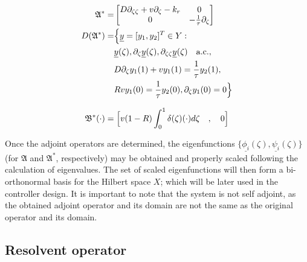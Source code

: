\begin{equation} \label{eq:2_adjoint_A}
    \begin{aligned}
        {\mathfrak{A}}^{*} =&
        \begin{bmatrix}
            D \partial_{\zeta \zeta} + v \partial_\zeta - k_r & 0\\
            0 & -\frac{1}{\tau} \partial_\zeta
        \end{bmatrix}\\
        D(\mathfrak{A}^*) =& \Bigl\{ \underline{y} = [y_1, y_2]^T \in Y:\\
        &\underline{y}(\zeta), \partial_\zeta \underline{y}(\zeta), \partial_{\zeta \zeta} \underline{y}(\zeta) \quad \mathrm{a.c.},\\
        &D \partial_\zeta y_1(1) + v y_1(1) = \frac{1}{\tau} y_2(1), \\
        &R v y_1(0) = \frac{1}{\tau} y_2(0), 
        \partial_\zeta y_1(0) = 0 \Bigr\}
    \end{aligned}
\end{equation}

\begin{equation} \label{eq:2_adjoint_B}
    \mathfrak{B}^* (\cdot) = \Bigl[ v(1-R) \int_0^1 \delta(\zeta) (\cdot) d\zeta \quad , \quad 0 \Bigr]
\end{equation}

Once the adjoint operators are determined, the eigenfunctions $\{ \underline{\phi_i}(\zeta), \underline{\psi_i}(\zeta) \}$ (for $\mathfrak{A}$ and $\mathfrak{A}^*$, respectively) may be obtained and properly scaled following the calculation of eigenvalues. The set of scaled eigenfunctions will then form a bi-orthonormal basis for the Hilbert space $X$; which will be later used in the controller design. It is important to note that the system is not self adjoint, as the obtained adjoint operator and its domain are not the same as the original operator and its domain.

\subsection{Resolvent operator}

